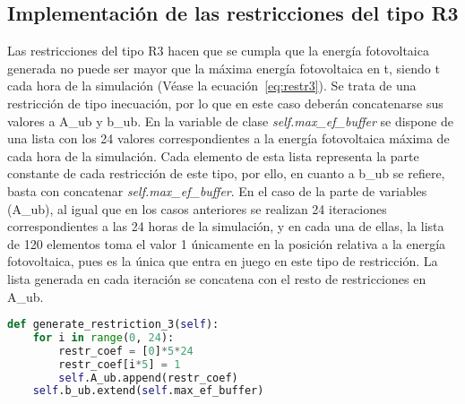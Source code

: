 \subsection{Implementación de las restricciones del tipo R3}
Las restricciones del tipo R3 hacen que se cumpla que la energía fotovoltaica generada no puede ser mayor que la máxima energía fotovoltaica en t, siendo t cada hora de la simulación (Véase la ecuación~\ref{eq:restr3}). Se trata de una restricción de tipo inecuación, por lo que en este caso deberán concatenarse sus valores a A\_ub y b\_ub. En la variable de clase \textit{self.max\_ef\_buffer} se dispone de una lista con los 24 valores correspondientes a la energía fotovoltaica máxima de cada hora de la simulación. Cada elemento de esta lista representa la parte constante de cada restricción de este tipo, por ello, en cuanto a b\_ub se refiere, basta con concatenar \textit{self.max\_ef\_buffer}. En el caso de la parte de variables (A\_ub), al igual que en los casos anteriores se realizan 24 iteraciones correspondientes a las 24 horas de la simulación, y en cada una de ellas, la lista de 120 elementos toma el valor 1 únicamente en la posición relativa a la energía fotovoltaica, pues es la única que entra en juego en este tipo de restricción. La lista generada en cada iteración se concatena con el resto de restricciones en A\_ub.
\begin{lstlisting}[language=Python,float=ht,caption={Restricciones del tipo R3},label={lst:restr3}]
def generate_restriction_3(self):
    for i in range(0, 24):
        restr_coef = [0]*5*24
        restr_coef[i*5] = 1
        self.A_ub.append(restr_coef)
    self.b_ub.extend(self.max_ef_buffer)
\end{lstlisting}
